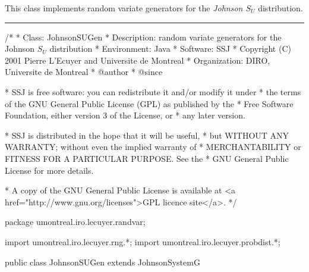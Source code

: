 
This class implements random variate generators for the
{\em Johnson $S_U$\/} distribution.


\bigskip\hrule

\begin{code}
\begin{hide}
/*
 * Class:        JohnsonSUGen
 * Description:  random variate generators for the Johnson $S_U$ distribution
 * Environment:  Java
 * Software:     SSJ
 * Copyright (C) 2001  Pierre L'Ecuyer and Universite de Montreal
 * Organization: DIRO, Universite de Montreal
 * @author
 * @since

 * SSJ is free software: you can redistribute it and/or modify it under
 * the terms of the GNU General Public License (GPL) as published by the
 * Free Software Foundation, either version 3 of the License, or
 * any later version.

 * SSJ is distributed in the hope that it will be useful,
 * but WITHOUT ANY WARRANTY; without even the implied warranty of
 * MERCHANTABILITY or FITNESS FOR A PARTICULAR PURPOSE.  See the
 * GNU General Public License for more details.

 * A copy of the GNU General Public License is available at
   <a href="http://www.gnu.org/licenses">GPL licence site</a>.
 */
\end{hide}
package umontreal.iro.lecuyer.randvar;\begin{hide}
import umontreal.iro.lecuyer.rng.*;
import umontreal.iro.lecuyer.probdist.*;
\end{hide}

public class JohnsonSUGen extends JohnsonSystemG \begin{hide} {
\end{hide}\end{code}

